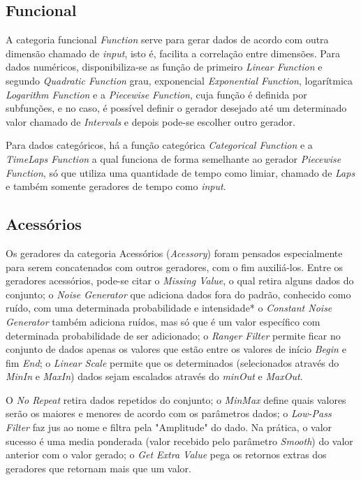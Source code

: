 \documentclass[
	12pt,				%
	openright,			%
	twoside,			%
	a4paper,			%
	english,			%
	brazil				%
	]{abntex2}
\begin{document}
		\subsection{Funcional}
		A categoria funcional \emph{Function} serve para gerar dados de acordo com outra dimensão chamado de \emph{input}, isto é, facilita a correlação entre dimensões.
		Para dados numéricos, disponibiliza-se as 
			função de primeiro \emph{Linear Function} e 
			segundo \emph{Quadratic Function} grau, 
			exponencial \emph{Exponential Function}, 
			logarítmica \emph{Logarithm Function} e
			a \emph{Piecewise Function}, cuja função é definida por subfunções, e no caso, é possível definir o gerador desejado até um determinado valor chamado de \emph{Intervals} e depois pode-se escolher outro gerador.
		\par
		Para dados categóricos, há a função categórica \emph{Categorical Function} e 
		a \emph{TimeLaps Function} a qual funciona de forma semelhante ao gerador \emph{Piecewise Function}, só que utiliza uma quantidade de tempo como limiar, chamado de \emph{Laps} e também somente geradores de tempo como \emph{input}.
		\subsection{Acessórios}
		Os geradores da categoria Acessórios (\emph{Acessory}) foram pensados especialmente para serem concatenados com outros geradores, com o fim auxiliá-los.
		Entre os geradores acessórios, pode-se citar o \emph{Missing Value}, o qual retira alguns dados do conjunto;
			o \emph{Noise Generator} que adiciona dados fora do padrão, conhecido como ruído, com uma determinada probabilidade e intensidade*
			o \emph{Constant Noise Generator} também adiciona ruídos, mas só que é um valor específico com determinada probabilidade de ser adicionado;
			o \emph{Ranger Filter} permite ficar no conjunto de dados apenas os valores que estão entre os valores de início \emph{Begin} e fim \emph{End};
			o \emph{Linear Scale} permite que os determinados (selecionados através do \emph{MinIn} e \emph{MaxIn}) dados sejam escalados através do \emph{minOut} e \emph{MaxOut}.
		\par
		O \emph{No Repeat} retira dados repetidos do conjunto;
			o \emph{MinMax} define quais valores serão os maiores e menores de acordo com os parâmetros dados;
			o \emph{Low-Pass Filter} faz jus ao nome e filtra pela "Amplitude" do dado. Na prática, o valor sucesso é uma media ponderada (valor recebido pelo parâmetro \emph{Smooth}) do valor anterior com o valor gerado;
			o \emph{Get Extra Value} pega os retornos extras dos geradores que retornam mais que um valor.
\end{document}

